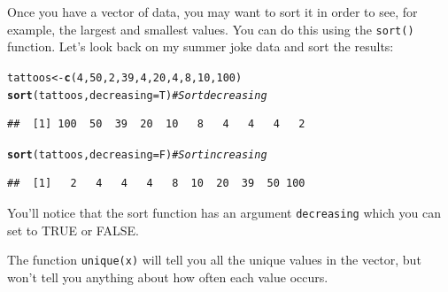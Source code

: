 \documentclass{tufte-book}\usepackage[]{graphicx}\usepackage[]{color}
\makeatletter
\newcommand{\hlnum}[1]{\textcolor[rgb]{0.686,0.059,0.569}{#1}}%
\newcommand{\hlcom}[1]{\textcolor[rgb]{0.678,0.584,0.686}{\textit{#1}}}%
\newcommand{\hlstd}[1]{\textcolor[rgb]{0.345,0.345,0.345}{#1}}%
\newcommand{\hlkwb}[1]{\textcolor[rgb]{0.69,0.353,0.396}{#1}}%
\newcommand{\hlkwc}[1]{\textcolor[rgb]{0.333,0.667,0.333}{#1}}%
\newcommand{\hlkwd}[1]{\textcolor[rgb]{0.737,0.353,0.396}{\textbf{#1}}}%
\newenvironment{kframe}{%
 \def\at@end@of@kframe{}%
 \ifinner\ifhmode%
  \def\at@end@of@kframe{\end{minipage}}%
  \begin{minipage}{\columnwidth}%
 \fi\fi%
 \def\FrameCommand##1{\hskip\@totalleftmargin \hskip-\fboxsep
 \colorbox{shadecolor}{##1}\hskip-\fboxsep
     \hskip-\linewidth \hskip-\@totalleftmargin \hskip\columnwidth}%
 \MakeFramed {\advance\hsize-\width
   \@totalleftmargin\z@ \linewidth\hsize
   \@setminipage}}%
 {\par\unskip\endMakeFramed%
 \at@end@of@kframe}
\newenvironment{knitrout}{}{} %
\makeatother
\begin{document}
\begin{footnotesize}
{{\begin{description}
\end{description}

}
}
\vspace{5mm} %

Once you have a vector of data, you may want to sort it in order to see, for example, the largest and smallest values. You can do this using the \texttt{sort()} function. Let's look back on my summer joke data and sort the results:

\begin{footnotesize}
\begin{knitrout}
\color{fgcolor}\begin{kframe}
\begin{alltt}
\hlstd{tattoos} \hlkwb{<-} \hlkwd{c}\hlstd{(}\hlnum{4}\hlstd{,} \hlnum{50}\hlstd{,} \hlnum{2}\hlstd{,} \hlnum{39}\hlstd{,} \hlnum{4}\hlstd{,} \hlnum{20}\hlstd{,} \hlnum{4}\hlstd{,} \hlnum{8}\hlstd{,} \hlnum{10}\hlstd{,} \hlnum{100}\hlstd{)}
\hlkwd{sort}\hlstd{(tattoos,} \hlkwc{decreasing} \hlstd{= T)} \hlcom{# Sort decreasing}
\end{alltt}
\begin{verbatim}
##  [1] 100  50  39  20  10   8   4   4   4   2
\end{verbatim}
\begin{alltt}
\hlkwd{sort}\hlstd{(tattoos,} \hlkwc{decreasing} \hlstd{= F)} \hlcom{# Sort increasing}
\end{alltt}
\begin{verbatim}
##  [1]   2   4   4   4   8  10  20  39  50 100
\end{verbatim}
\end{kframe}
\end{knitrout}
\end{footnotesize}

You'll notice that the sort function has an argument \texttt{decreasing} which you can set to TRUE or FALSE.

The function \texttt{unique(x)} will tell you all the unique values in the vector, but won't tell you anything about how often each value occurs.



\end{footnotesize}
\end{document}
